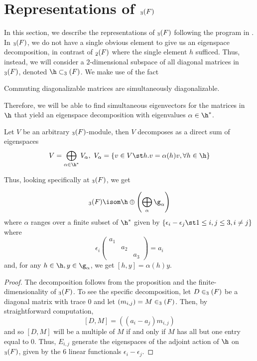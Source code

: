 \documentclass[11pt,leqno,oneside]{amsart}
\numberwithin{thm}{section}
\begin{document}
\section{Representations of \(\sl_3(F)\)}
In this section, we describe the representations of \(\sl_3(F)\)
following the program in \cite{fulton}. In \(\sl_3(F)\), we do not have a single obvious element to give us an
eigenspace decomposition, in contrast of \(\sl_2(F)\) where the single
element \(h\)
sufficed. Thus, instead, we will consider a 
\(2\)-dimensional subspace of all diagonal matrices in \(\sl_3(F)\),
denoted \(\h \subset \sl_3(F)\). We make use of the fact
\begin{lem}
  Commuting diagonalizable matrices are simultaneously diagonalizable.
\end{lem}
Therefore, we will be able to find simultaneous eigenvectors for the
matrices in \(\h\) that yield an eigenspace decomposition with
eigenvalues \(\alpha \in \h^*\).
\begin{prop}
  Let \(V\) be an arbitrary \(\sl_3(F)\)-module, then \(V\)
  decomposes as a direct sum of eigenspaces \[
    V = \bigoplus_{\alpha \in \h^*} V_\alpha, \ V_\alpha = \{v \in V
    \st h.v = \alpha(h)v, \forall h \in \h\}
  \]
\end{prop}
Thus, looking specifically at \(\sl_3(F)\), we get
\begin{cor}\label{sl3-root-decomp}
  \[\sl_3(F) \isom \h \oplus \left( \bigoplus_{\alpha}
      \g_\alpha \right)\]
  where \(\alpha\) ranges over a finite subset of \(\h^*\) given by
  \(\{\epsilon_i-\epsilon_j \st 1 \leq i,j \leq 3, i \neq j\}\)
  where \[
    \epsilon_i \left(
      \begin{array}{ccc}
        a_1&&\\
           &a_2&\\
        &&a_3
      \end{array}
\right) = a_i
\]
  and, for any \(h \in \h, y \in \g_\alpha\), we get \([h,y] =
  \alpha(h)y\). 
\end{cor}
\begin{proof}
  The decomposition follows from the proposition and the
  finite-dimensionality of \(\sl_3(F)\). To see the specific
  decomposition, let \(D \in \sl_3(F)\) be a diagonal matrix with
  trace \(0\) and let \((m_{i,j}) = M \in \sl_3(F)\). Then, by
  straightforward computation, \[
    [D,M] = \left((a_i - a_j)m_{i,j}\right)
  \]
  and so \([D,M]\) will be a multiple of \(M\) if and only if \(M\)
  has all but one entry equal to \(0\). Thus, \(E_{i,j}\) generate the
  eigenspaces of the adjoint action of \(\h\) on \(\sl_3(F)\), given
  by the \(6\) linear functionals \(\epsilon_i-\epsilon_j\).
\end{proof}
\end{document}
